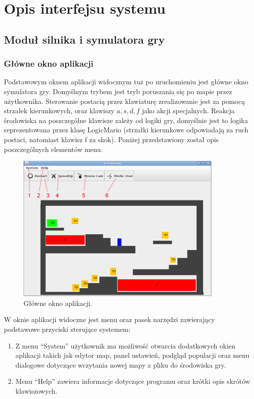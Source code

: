 \chapter{Opis interfejsu systemu}
\section{Moduł silnika i symulatora gry}
\subsection{Główne okno aplikacji}
\begin{par}
Podstawowym oknem aplikacji widocznym tuż po uruchomieniu jest główne okno symulatora gry. 
Domyślnym trybem jest tryb poruszania się po mapie przez użytkownika. 
Sterowanie postacią przez klawiaturę zrealizowanie jest za pomocą strzałek kierunkowych, oraz klawiszy $a,s,d,f$ jako akcji specjalnych.
Reakcja środowiska na poszczególne klawisze zależy od logiki gry, domyślnie jest to logika reprezentowana przez klasę LogicMario (strzałki kierunkowe odpowiadają za ruch postaci, natomiast klawisz f za skok).
Poniżej przedstawiony został opis poszczególnych elementów menu.
\begin{figure}[!h]
		\centering
		\includegraphics[width=4in]{obrazki/main_window.png}
		\caption{Główne okno aplikacji.}
		\label{fig:main_window}
	\end{figure}
W oknie aplikacji widoczne jest menu oraz pasek narzędzi zawierający podstawowe przyciski sterujące systemem:
	\begin{enumerate}
	\item Z menu ``System'' użytkownik ma możliwość otwarcia dodatkowych okien aplikacji takich jak edytor map, panel ustawień, podgląd populacji oraz menu dialogowe dotyczące wczytania nowej mapy z pliku do środowiska gry.
	\item Menu ``Help'' zawiera informacje dotyczące programu oraz krótki opis skrótów klawiszowych.

\end{enumerate}
\end{par}
